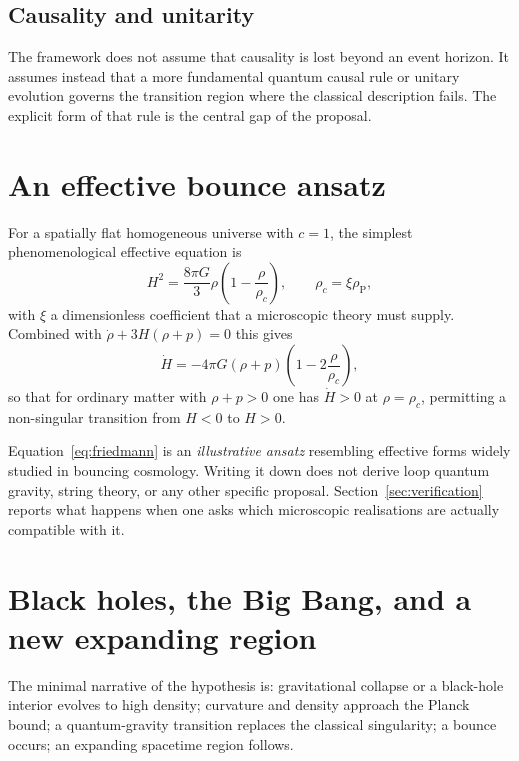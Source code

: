 \documentclass[a4paper,11pt]{article}
\begin{document}
\subsection{Causality and unitarity}

The framework does not assume that causality is lost beyond an event horizon. It assumes instead that a more fundamental quantum causal rule or unitary evolution governs the transition region where the classical description fails. The explicit form of that rule is the central gap of the proposal.

\section{An effective bounce ansatz}

For a spatially flat homogeneous universe with $c=1$, the simplest phenomenological effective equation is
\begin{equation}
H^{2}=\frac{8\pi G}{3}\rho\left(1-\frac{\rho}{\rho_c}\right),
\qquad \rho_c=\xi\rho_\mathrm{P},
\label{eq:friedmann}
\end{equation}
with $\xi$ a dimensionless coefficient that a microscopic theory must supply. Combined with $\dot\rho+3H(\rho+p)=0$ this gives
\begin{equation}
\dot H=-4\pi G(\rho+p)\left(1-2\frac{\rho}{\rho_c}\right),
\end{equation}
so that for ordinary matter with $\rho+p>0$ one has $\dot H>0$ at $\rho=\rho_c$, permitting a non-singular transition from $H<0$ to $H>0$.

Equation~\eqref{eq:friedmann} is an \emph{illustrative ansatz} resembling effective forms widely studied in bouncing cosmology. Writing it down does not derive loop quantum gravity, string theory, or any other specific proposal. Section~\ref{sec:verification} reports what happens when one asks which microscopic realisations are actually compatible with it.

\section{Black holes, the Big Bang, and a new expanding region}
\label{sec:bh}

The minimal narrative of the hypothesis is: gravitational collapse or a black-hole interior evolves to high density; curvature and density approach the Planck bound; a quantum-gravity transition replaces the classical singularity; a bounce occurs; an expanding spacetime region follows.
\end{document}
